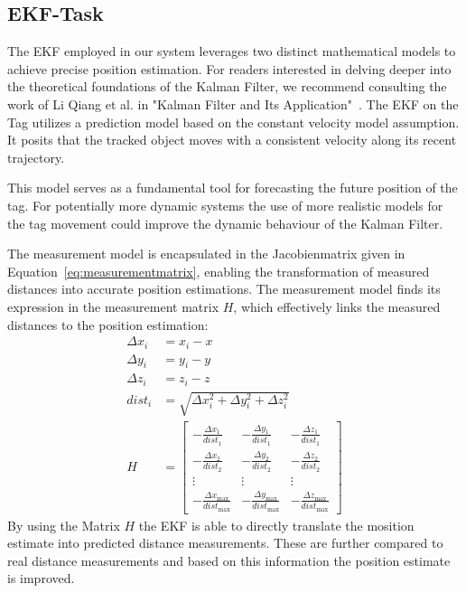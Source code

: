 \documentclass[10pt,a4paper,twocolumn]{article}
\begin{document}
\subsection{EKF-Task}\label{section:firmware-ekf}
The \ac{EKF} employed in our system leverages two distinct mathematical models
to achieve precise position estimation.
For readers interested in delving deeper into the theoretical foundations of the
Kalman Filter, we recommend consulting the work of Li Qiang et al. in
"Kalman Filter and Its Application"~\cite{Kalman}.
The EKF  on the Tag utilizes a prediction model based on the constant velocity model assumption.
It posits that the tracked object moves with a consistent velocity along its recent
trajectory.

This model serves as a fundamental tool for forecasting the future position of the tag.
For potentially more dynamic systems the use of more realistic models
for the tag movement could improve the dynamic behaviour of the Kalman Filter.

The measurement model is encapsulated in the Jacobienmatrix given in Equation~\ref{eq:measurementmatrix},
enabling the transformation of measured distances into accurate position estimations.
The measurement model finds its expression in the measurement matrix $H$,
which effectively links the measured distances to the position estimation:
\begin{equation}
  \begin{aligned}
    \Delta x_i &= x_i - x \\
    \Delta y_i &= y_i - y \\
    \Delta z_i &= z_i - z \\
    dist_i &= \sqrt{{\Delta x_i^2 + \Delta y_i^2 + \Delta z_i^2}} \\
    H &= \begin{bmatrix}
    -\frac{{\Delta x_1}}{{dist_1}} & -\frac{{\Delta y_1}}{{dist_1}} & -\frac{{\Delta z_1}}{{dist_1}} \\
    -\frac{{\Delta x_2}}{{dist_2}} & -\frac{{\Delta y_2}}{{dist_2}} & -\frac{{\Delta z_2}}{{dist_2}} \\
    \vdots & \vdots & \vdots \\
    -\frac{{\Delta x_{\text{max}}}}{{dist_{\text{max}}}} & -\frac{{\Delta y_{\text{max}}}}{{dist_{\text{max}}}} & -\frac{{\Delta z_{\text{max}}}}{{dist_{\text{max}}}}
    \end{bmatrix}
  \end{aligned}
  \label{eq:measurementmatrix}
\end{equation}
By using the Matrix $H$ the \ac{EKF} is able to directly translate the mosition estimate into predicted distance measurements.
These are further compared to real distance measurements and based on this information the position estimate is improved.
\end{document}
